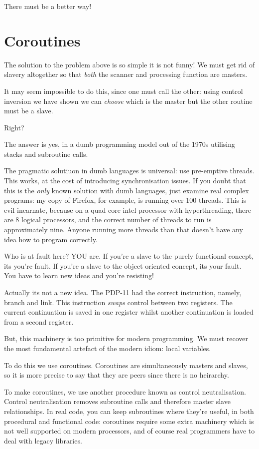 \documentclass{article}
\begin{document}
There must be a better way!

\section{Coroutines}
The solution to the problem above is so simple it is not funny!
We must get rid of slavery altogether so that {\em both} the scanner
and processing function are masters.

It may seem impossible to do this, since one must call the
other: using control inversion we have shown we can {\em choose}
which is the master but the other routine must be a slave.

Right?

The answer is yes, in a dumb programming model out of the 1970s
utilising stacks and subroutine calls.

The pragmatic solutiuon in dumb languages is universal: use 
pre-emptive threads. This works, at the cost of introducing
synchronisation issues. If you doubt that this is the {\em only}
known solution with dumb languages, just examine real complex
programs: my copy of Firefox, for example, is running over 100
threads. This is evil incarnate, because on a quad core intel processor
with hyperthreading, there are 8 logical processors, and the correct
number of threads to run is approximately nine. Anyone running more
threads than that doesn't have any idea how to program correctly.

Who is at fault here? YOU are. If you're a slave to the purely
functional concept, its you're fault. If you're a slave to the
object oriented concept, its your fault. You have to learn new
ideas and you're resisting!

Actually its not a new idea. The PDP-11 had the correct instruction,
namely, branch and link. This instruction {\em swaps} control between
two registers. The current continuation is saved in one register whilst
another continuation is loaded from a second register.

But, this machinery is too primitive for modern programming.
We must recover the most fundamental artefact of the modern
idiom: local variables. 

To do this we use coroutines. Coroutines are simultaneously masters and slaves,
so it is more precise to say that they are peers since there is no heirarchy.

To make coroutines, we use another procedure known as control neutralisation.
Control neutralisation removes subroutine calls and therefore master
slave relationships. In real code, you can keep subroutines where they're
useful, in both procedural and functional code: coroutines require some
extra machinery which is not well supported on modern processors, and of course
real programmers have to deal with legacy libraries.
\end{document}
